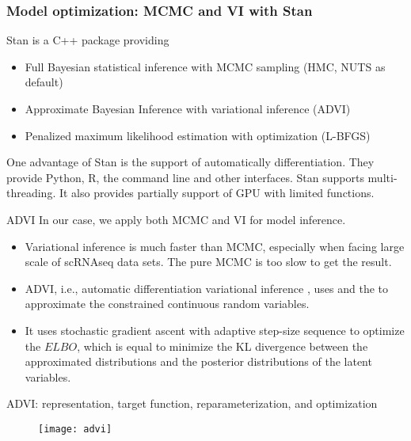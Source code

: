 \begin{frame}
  \frametitle{Model optimization: MCMC and VI with Stan}
  Stan is a C++ package providing
  \begin{itemize}
  \item
    Full Bayesian statistical inference with MCMC sampling (HMC, NUTS as default)
  \item
    Approximate Bayesian Inference with variational inference (ADVI)
  \item
    Penalized maximum likelihood estimation with optimization (L-BFGS)
  \end{itemize}
  One advantage of Stan is the support of automatically differentiation. They
  provide Python, R, the command line and other interfaces. Stan supports
  multi-threading. It also provides partially support of GPU with limited functions.\\
\end{frame}

\begin{frame}{ADVI}
  In our case, we apply both MCMC and VI for model inference.
  \begin{itemize}
  \item
    Variational inference is much faster than MCMC, especially when facing large
    scale of scRNAseq data sets. The pure MCMC is too slow to get the result.
  \item
    ADVI, i.e., automatic differentiation variational inference
    \cite{kucukelbir2017automatic}, uses  and the  to
    approximate the constrained continuous random variables.
  \item
    It uses stochastic gradient ascent with adaptive step-size sequence
    to optimize the \(ELBO\), which is equal to minimize the KL
    divergence between the approximated distributions and the posterior
    distributions of the latent variables.
  \end{itemize}
\end{frame}

\begin{frame}{ADVI: representation, target function, reparameterization, and optimization}
  \begin{figure}
    \centering
    \texttt{[image: advi]}
  \end{figure}
\end{frame}
